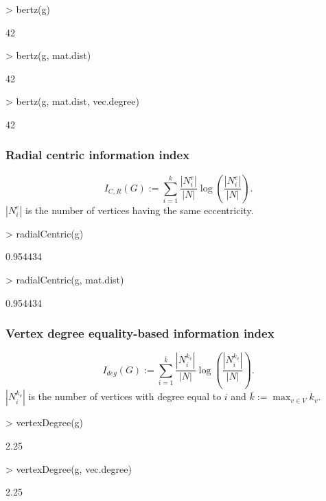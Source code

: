 \documentclass[a4paper]{article}
\begin{document}
\begin{Schunk}
\begin{Sinput}
> bertz(g)
\end{Sinput}
\begin{Soutput}
[1] 42
\end{Soutput}
\begin{Sinput}
> bertz(g, mat.dist)
\end{Sinput}
\begin{Soutput}
[1] 42
\end{Soutput}
\begin{Sinput}
> bertz(g, mat.dist, vec.degree)
\end{Sinput}
\begin{Soutput}
[1] 42
\end{Soutput}
\end{Schunk}
\subsubsection*{Radial centric information index}
\begin{equation}\label{radial_index}
I_{C,R}(G) := \sum_{i=1}^{k} \frac{|N^e_i|}{|N|} \log \left( \frac{|N^e_i|}{|N|} \right).
\end{equation}
%
$|N^e_i|$ is the number of vertices having the same eccentricity.
\begin{Schunk}
\begin{Sinput}
> radialCentric(g)
\end{Sinput}
\begin{Soutput}
[1] 0.954434
\end{Soutput}
\begin{Sinput}
> radialCentric(g, mat.dist)
\end{Sinput}
\begin{Soutput}
[1] 0.954434
\end{Soutput}
\end{Schunk}
\subsubsection*{Vertex degree equality-based information index}
\begin{equation}
I_{deg}(G) := \sum_{i=1}^{\bar{k}} \frac{|N^{k_v}_i|}{|N|} \log \left( \frac{|N^{k_v}_i|}{|N|} \right).
\end{equation}
%
$|N^{k_v}_i|$ is the number of vertices with degree equal to $i$ and $\bar{k}:= \max_{v\in V}k_v$.
\begin{Schunk}
\begin{Sinput}
> vertexDegree(g)
\end{Sinput}
\begin{Soutput}
[1] 2.25
\end{Soutput}
\begin{Sinput}
> vertexDegree(g, vec.degree)
\end{Sinput}
\begin{Soutput}
[1] 2.25
\end{Soutput}
\end{Schunk}
\end{document}

